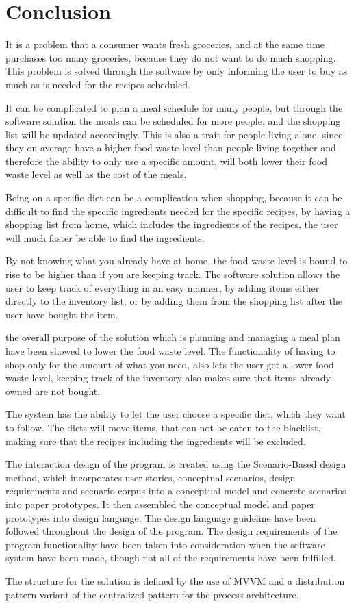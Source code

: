 \chapter{Conclusion}

It is a problem that a consumer wants fresh groceries, and at the same time purchases too many groceries, because they do not want to do much shopping. This problem is solved through the software  by only informing the user to buy as much as is needed for the recipes scheduled.

It can be complicated to plan a meal schedule for many people, but through the software solution the meals can be scheduled for more people, and the shopping list will be updated accordingly. This is also a trait for people living alone, since they on average have a higher food waste level than people living together and therefore the ability to only use a specific amount, will both lower their food waste level as well as the cost of the meals.

Being on a specific diet can be a complication when shopping, because it can be difficult to find the specific ingredients needed for the specific recipes, by having a shopping list from home, which includes the ingredients of the recipes, the user will much faster be able to find the ingredients.

By not knowing what you already have at home, the food waste level is bound to rise to be higher than if you are keeping track. The software solution allows the user to keep track of everything in an easy manner, by adding items either directly to the inventory list, or by adding them from the shopping list after the user have bought the item. 

the overall purpose of the solution which is planning and managing a meal plan have been showed to lower the food waste level. The functionality of having to shop only for the amount of what you need, also lets the user get a lower food waste level, keeping track of the inventory also makes sure that items already owned are not bought.

The system has the ability to let the user choose a specific diet, which they want to follow. The diets will move items, that can not be eaten to the blacklist, making sure that the recipes including the ingredients will be excluded.

The interaction design of the program is created using the Scenario-Based design method, which incorporates user stories, conceptual scenarios, design requirements and scenario corpus into a conceptual model and concrete scenarios into paper prototypes. It then assembled the conceptual model and paper prototypes into design language. The design language guideline have been followed throughout the design of the program. The design requirements of the program functionality have been taken into consideration when the software system have been made, though not all of the requirements have been fulfilled.

The structure for the solution is defined by the use of MVVM and a distribution pattern variant of the centralized pattern for the process architecture. 